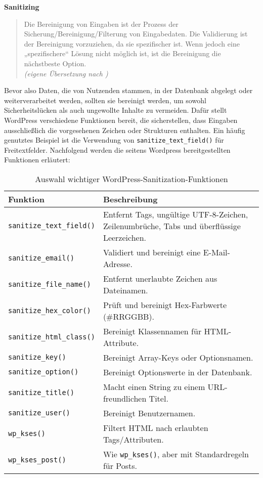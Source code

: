 \textbf{Sanitizing}
\begin{quote}
 Die Bereinigung von Eingaben ist der Prozess der Sicherung/Bereinigung/Filterung von Eingabedaten.
 Die Validierung ist der Bereinigung vorzuziehen, da sie spezifischer ist.
 Wenn jedoch eine „spezifischere“ Lösung nicht möglich ist, ist die Bereinigung die nächstbeste Option.
 \\[0.5em]
 \emph{(eigene Übersetzung nach \cite{wordpress2024plugin_sanitizing})}
\end{quote}


Bevor also Daten, die von Nutzenden stammen, in der Datenbank abgelegt oder weiterverarbeitet werden,
sollten sie bereinigt werden, um sowohl Sicherheitslücken als auch ungewollte Inhalte zu vermeiden.
Dafür stellt WordPress verschiedene Funktionen bereit, die sicherstellen, dass Eingaben ausschließlich
die vorgesehenen Zeichen oder Strukturen enthalten.
Ein häufig genutztes Beispiel ist die Verwendung von \texttt{sanitize\_text\_field()} für Freitextfelder.
Nachfolgend werden die seitens Wordpress bereitgestellten Funktionen erläutert:

\begin{table}[h]
 \centering
 \begin{tabular}{|l|p{8cm}|}
  \hline
  \textbf{Funktion} & \textbf{Beschreibung} \\
  \hline
  \texttt{sanitize\_text\_field()} & Entfernt Tags, ungültige UTF-8-Zeichen, Zeilenumbrüche, Tabs und überflüssige Leerzeichen. \\
  \hline
  \texttt{sanitize\_email()} & Validiert und bereinigt eine E-Mail-Adresse. \\
  \hline
  \texttt{sanitize\_file\_name()} & Entfernt unerlaubte Zeichen aus Dateinamen. \\
  \hline
  \texttt{sanitize\_hex\_color()} & Prüft und bereinigt Hex-Farbwerte (\#RRGGBB). \\
  \hline
  \texttt{sanitize\_html\_class()} & Bereinigt Klassennamen für HTML-Attribute. \\
  \hline
  \texttt{sanitize\_key()} & Bereinigt Array-Keys oder Optionsnamen. \\
  \hline
  \texttt{sanitize\_option()} & Bereinigt Optionswerte in der Datenbank. \\
  \hline
  \texttt{sanitize\_title()} & Macht einen String zu einem URL-freundlichen Titel. \\
  \hline
  \texttt{sanitize\_user()} & Bereinigt Benutzernamen. \\
  \hline
  \texttt{wp\_kses()} & Filtert HTML nach erlaubten Tags/Attributen. \\
  \hline
  \texttt{wp\_kses\_post()} & Wie \texttt{wp\_kses()}, aber mit Standardregeln für Posts. \\
  \hline
 \end{tabular}
 \caption{Auswahl wichtiger WordPress-Sanitization-Funktionen}
\end{table}

